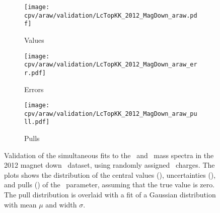 \begin{figure}
  \begin{subfigure}[t]{0.32\textwidth}
    \texttt{[image: cpv/araw/validation/LcTopKK\_2012\_MagDown\_araw.pdf]}
    \caption{Values}
    \label{fig:cpv:araw:validation:null:pKK:values}
  \end{subfigure}
  \begin{subfigure}[t]{0.32\textwidth}
    \texttt{[image: cpv/araw/validation/LcTopKK\_2012\_MagDown\_araw\_err.pdf]}
    \caption{Errors}
    \label{fig:cpv:araw:validation:null:pKK:errors}
  \end{subfigure}
  \begin{subfigure}[t]{0.32\textwidth}
    \texttt{[image: cpv/araw/validation/LcTopKK\_2012\_MagDown\_araw\_pull.pdf]}
    \caption{Pulls}
    \label{fig:cpv:araw:validation:null:pKK:pulls}
  \end{subfigure}
  \caption{%
    Validation of the simultaneous fits to the \PLambdac\ and \APLambdac\ mass 
    spectra in the 2012 magnet down \pKK\ dataset, using randomly assigned 
    \PLambdac\ charges.
    The plots shows the distribution of the central values 
    (), uncertainties 
    (), and pulls 
    () of the \ARaw\ parameter, 
    assuming that the true value is zero.
    The pull distribution is overlaid with a fit of a Gaussian distribution 
    with mean $\mu$ and width $\sigma$.
  }
  \label{fig:cpv:araw:validation:null:pKK}
\end{figure}

